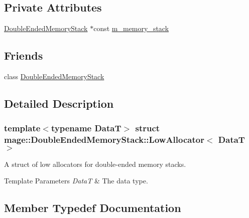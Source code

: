 \subsection*{Private Attributes}
\begin{DoxyCompactItemize}
\item 
\hyperlink{classmage_1_1_double_ended_memory_stack}{Double\+Ended\+Memory\+Stack} $\ast$const \hyperlink{structmage_1_1_double_ended_memory_stack_1_1_low_allocator_a2162e2789f0add4d7a9aac5408c1e7d5}{m\+\_\+memory\+\_\+stack}
\end{DoxyCompactItemize}
\subsection*{Friends}
\begin{DoxyCompactItemize}
\item 
class \hyperlink{structmage_1_1_double_ended_memory_stack_1_1_low_allocator_a10ae729d55b8c0017057250445835680}{Double\+Ended\+Memory\+Stack}
\end{DoxyCompactItemize}


\subsection{Detailed Description}
\subsubsection*{template$<$typename DataT$>$\newline
struct mage\+::\+Double\+Ended\+Memory\+Stack\+::\+Low\+Allocator$<$ Data\+T $>$}

A struct of low allocators for double-\/ended memory stacks.


\begin{DoxyTemplParams}{Template Parameters}
{\em DataT} & The data type. \\
\hline
\end{DoxyTemplParams}


\subsection{Member Typedef Documentation}
\hypertarget{structmage_1_1_double_ended_memory_stack_1_1_low_allocator_a5c3c7e9fde98e421a2f22d6b7cfbc83e}{}\label{structmage_1_1_double_ended_memory_stack_1_1_low_allocator_a5c3c7e9fde98e421a2f22d6b7cfbc83e} 
